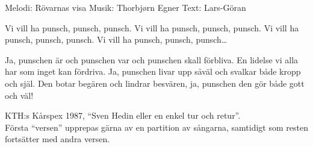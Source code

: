 \begin{song}

\begin{songmeta}
Melodi: Rövarnas visa
Musik: Thorbjørn Egner
Text: Lars-Göran
\end{songmeta}

\begin{songtext}
Vi vill ha punsch, punsch, punsch.
Vi vill ha punsch, punsch, punsch.
Vi vill ha punsch, punsch, punsch.
Vi vill ha punsch, punsch, punsch\ldots

Ja, punschen är och punschen var
och punschen skall förbliva.
En lidelse vi alla har
som inget kan fördriva.
Ja, punschen livar upp såväl
och svalkar både kropp och själ.
Den botar begären och lindrar besvären,
ja, punschen den gör både gott och väl!
\end{songtext}

\begin{songnotes}
KTH:s Kårspex 1987, \textquotedblleft{}Sven Hedin eller en enkel tur och retur\textquotedblright{}. \\
Första \textquotedblleft{}versen\textquotedblright{} upprepas gärna av en partition av sångarna, samtidigt som
resten fortsätter med andra versen.
\end{songnotes}
\end{song}
